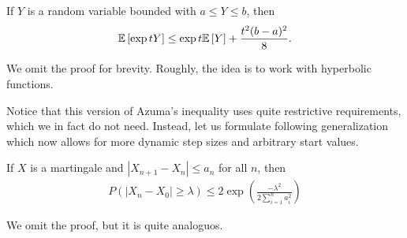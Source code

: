 \begin{lemma} \label{thm:hoeffding}
    If $Y$ is a random variable bounded with $a \leq Y \leq b$, then
    \begin{align}
        \mathbb{E}\left[\exp{tY}\right] \leq \exp{t\mathbb{E}\left[Y\right] + \frac{t^2(b-a)^2}{8}}.
    \end{align}
\end{lemma}
We omit the proof for brevity. Roughly, the idea is to work with hyperbolic functions.

Notice that this version of Azuma's inequality uses quite restrictive requirements,
which we in fact do not need.
Instead, let us formulate following generalization which now allows for more dynamic step sizes and arbitrary start values.
\begin{theorem}
    If $X$ is a martingale and $|X_{n+1} - X_n| \leq a_n$ for all $n$, then
    \begin{align}
        P(|X_n - X_0| \geq \lambda) \leq 2 \exp\left(\frac{-\lambda^2}{2 \sum_{i=1}^{n}a_i^2}\right)
    \end{align}
\end{theorem}
We omit the proof, but it is quite analoguos.

